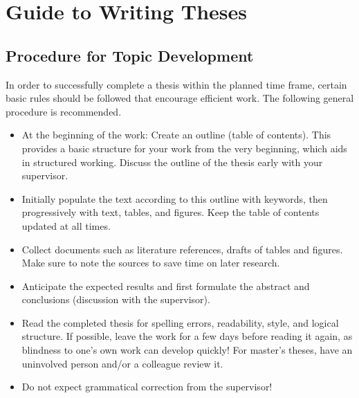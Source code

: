 %
%

\section{Guide to Writing Theses}
\label{sec:guideToWritingTheses}


\subsection{Procedure for Topic Development}
\label{sec:procedureForTopicDevelopment}

In order to successfully complete a thesis within the planned time frame, certain basic rules should be followed that encourage efficient work. The following general procedure is recommended.

\begin{itemize}
    \item At the beginning of the work: Create an outline (table of contents). This provides a basic structure for your work from the very beginning, which aids in structured working. Discuss the outline of the thesis early with your supervisor.
    \item Initially populate the text according to this outline with keywords, then progressively with text, tables, and figures. Keep the table of contents updated at all times.
    \item Collect documents such as literature references, drafts of tables and figures. Make sure to note the sources to save time on later research.
    \item Anticipate the expected results and first formulate the abstract and conclusions (discussion with the supervisor).
    \item Read the completed thesis for spelling errors, readability, style, and logical structure. If possible, leave the work for a few days before reading it again, as blindness to one's own work can develop quickly! For master's theses, have an uninvolved person and/or a colleague review it.
    \item Do not expect grammatical correction from the supervisor!
\end{itemize}


